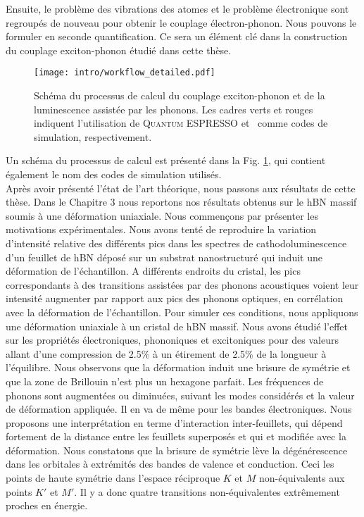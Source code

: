 Ensuite, le problème des vibrations des atomes et le problème électronique sont regroupés de nouveau pour obtenir le couplage électron-phonon. Nous pouvons le formuler en seconde quantification. Ce sera un élément clé dans la construction du couplage exciton-phonon étudié dans cette thèse. 
\begin{figure}[H]
	\vspace{0.2cm}
	\setcapindent{2em}
	\centering
	\texttt{[image: intro/workflow\_detailed.pdf]}
	\caption{Schéma du processus de calcul du couplage exciton-phonon et de la luminescence assistée par les phonons. Les cadres verts et rouges indiquent l'utilisation de \textsc{Quantum ESPRESSO} et \yambo~comme codes de simulation, respectivement.}
	\label{fig:workflow_fr}
\end{figure}
Un schéma du processus de calcul est présenté dans la Fig. \ref{fig:workflow_fr}, qui contient également le nom des codes de simulation utilisés.\\


%
%
Après avoir présenté l'état de l'art théorique, nous passons aux résultats de cette thèse. Dans le Chapitre 3 nous reportons nos résultats obtenus sur le hBN massif soumis à une déformation uniaxiale. Nous commençons par présenter les motivations expérimentales. Nous avons tenté de reproduire la variation d'intensité relative des différents pics dans les spectres de cathodoluminescence d'un feuillet de hBN déposé sur un substrat nanostructuré qui induit une déformation de l'échantillon. A différents endroits du cristal, les pics correspondants à des transitions assistées par des phonons acoustiques voient leur intensité augmenter par rapport aux pics des phonons optiques, en corrélation avec la déformation de l'échantillon. Pour simuler ces conditions, nous appliquons une déformation uniaxiale à un cristal de hBN massif. Nous avons étudié l'effet sur les propriétés électroniques, phononiques et excitoniques pour des valeurs allant d'une compression de 2.5\% à un étirement de 2.5\% de la longueur à l'équilibre.
Nous observons que la déformation induit une brisure de symétrie et que la zone de Brillouin n'est plus un hexagone parfait. Les fréquences de phonons sont augmentées ou diminuées, suivant les modes considérés et la valeur de déformation appliquée. Il en va de même pour les bandes électroniques. Nous proposons une interprétation en terme d'interaction inter-feuillets, qui dépend fortement de la distance entre les feuillets superposés et qui et modifiée avec la déformation. Nous constatons que la brisure de symétrie lève la dégénérescence dans les orbitales à extrémités des bandes de valence et conduction. Ceci les points de haute symétrie dans l'espace réciproque $K$ et $M$ non-équivalents aux points $K'$ et $M'$. Il y a donc quatre transitions non-équivalentes extrêmement proches en énergie. 


